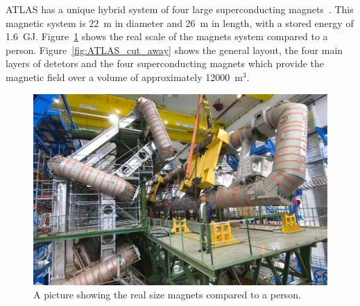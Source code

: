ATLAS has a unique hybrid system of four large superconducting 
magnets~\cite{ATLAS-TDR-06}. This magnetic system is 22~m in diameter and 26~m in length, 
with a stored energy of 1.6~GJ. Figure~\ref{fig:ATLAS_magnets_site} shows the real scale of
the magnets system compared to a person. 
Figure~\ref{fig:ATLAS_cut_away} shows the general layout, 
the four main layers of detetors and the four superconducting 
magnets which provide the magnetic
field over a volume of approximately 12000~m$^3$.



\begin{figure}[bht]
	\begin{centering}	
	\includegraphics[width=.8\textwidth]{Detector/plots/magnets.jpg}
	\caption{A picture showing the real size magnets compared to a person.}
	\label{fig:ATLAS_magnets_site}
	\end{centering}
\end{figure}




